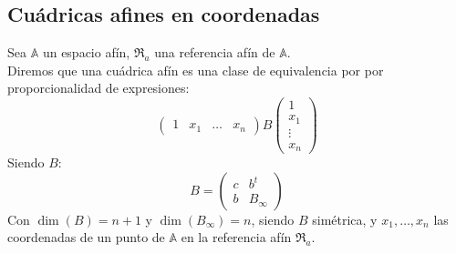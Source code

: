 \subsection{Cuádricas afines en coordenadas}

\begin{definición}
    Sea $\mathbb{A}$ un espacio afín, $\mathfrak{R}_a$ una referencia afín de $\mathbb{A}$.\\
    Diremos que una cuádrica afín es una clase de equivalencia por por proporcionalidad de expresiones:
    \[
    \begin{pmatrix}
        1 & x_1 & \ldots & x_n
    \end{pmatrix}
    B
    \begin{pmatrix}
        1 \\
        x_1 \\
        \vdots \\
        x_n
    \end{pmatrix}
    \]
    Siendo $B$:
    \[
    B =
    \left(
    \begin{array}{c|c}
        c & b^t \\
        \hline
        b & B_\infty
    \end{array}
    \right)
    \]
    Con $\dim(B) = n+1$ y $\dim(B_\infty) = n$, siendo $B$ simétrica, y $x_1, \ldots, x_n$ las coordenadas de un punto de $\mathbb{A}$ en la referencia afín $\mathfrak{R}_a$.
\end{definición}



